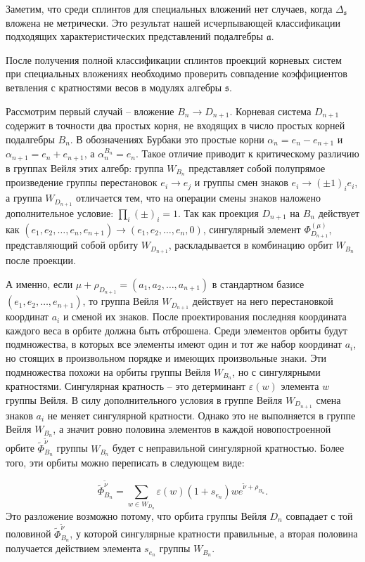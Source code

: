 \documentclass[12pt]{article}
\newcommand{\af}{\mathfrak{a}}
\newcommand{\sfr}{\mathfrak{s}}
\begin{document}
Заметим, что среди сплинтов для специальных вложений нет случаев, когда $\Delta_{\sfr}$ вложена не
метрически. Это результат нашей исчерпывающей классификации подходящих характеристических
представлений подалгебры $\af$.

После получения полной классификации сплинтов проекций корневых систем при специальных вложениях
необходимо проверить совпадение коэффициентов ветвления с кратностями весов в модулях алгебры $\sfr$.

Рассмотрим первый случай -- вложение $B_{n}\to D_{n+1}$. Корневая система $D_{n+1}$ содержит в
точности два простых корня, не входящих в число простых корней подалгебры $B_{n}$. В обозначениях Бурбаки
\cite{bourbaki2002lie} это простые корни $\alpha_{n}=e_n-e_{n+1}$ и $\alpha_{n+1}=e_n+e_{n+1}$, а
$\alpha_n^{B_n}=e_n$. Такое отличие приводит к критическому различию в группах Вейля этих алгебр:
группа $W_{B_{n}}$ представляет собой полупрямое произведение группы перестановок $e_{i} \to e_{j}$
и группы смен знаков $e_{i}\to (\pm 1)_{i}e_{i}$, а группа $W_{D_{n+1}}$ отличается тем, что на
операции смены знаков наложено дополнительное условие: $\prod_{i} (\pm)_{i}=1.$ Так как проекция
$D_{n+1}$ на $B_{n}$ действует как
$(e_1,e_2,\dots,e_{n},e_{n+1})\to(e_1,e_2,\dots,e_{n},0)$, сингулярный элемент
$\Phi^{(\mu)}_{D_{n+1}}$, представляющий собой орбиту $W_{D_{n+1}}$, раскладывается в комбинацию
орбит  $W_{B_{n}}$ после проекции.

А именно, если $\mu+\rho_{D_{n+1}}=(a_1,a_2,\dots,a_{n+1})$ в стандартном базисе
$(e_1,e_2,\dots,e_{n+1})$, то группа Вейля $W_{D_{n+1}}$ действует на него перестановкой координат
$a_i$ и сменой их знаков. После проектирования последняя координата каждого веса в орбите должна быть
отброшена. Среди элементов орбиты будут подмножества, в которых все элементы имеют один и тот же
набор координат $a_i$, но стоящих в произвольном порядке и имеющих произвольные знаки. Эти
подмножества похожи на орбиты группы Вейля $W_{B_{n}}$, но с сингулярными кратностями. Сингулярная
кратность -- это детерминант
$\varepsilon (w)$ элемента  $w$ группы Вейля. В силу дополнительного условия в группе Вейля
$W_{D_{n+1}}$ смена знаков  $a_i$ не меняет сингулярной кратности. Однако это не выполняется в
группе Вейля $W_{B_{n}}$, а значит ровно половина элементов в каждой новопостроенной орбите
$\tilde\Phi^{\tilde\nu}_{B_n}$ группы $W_{B_{n}}$ будет с неправильной сингулярной кратностью. Более
того, эти орбиты можно переписать в следующем виде:

\begin{equation}
\tilde\Phi^{\tilde\nu}_{B_n}=\sum_{w\in W_{D_n}} \varepsilon(w) (1+s_{e_n})w e^{\tilde\nu+\rho_{B_n}}.
\end{equation}
Это разложение возможно потому, что орбита группы Вейля $D_n$ совпадает с той половиной
$\tilde\Phi^{\tilde\nu}_{B_n}$, у которой сингулярные кратности правильные, а вторая половина
получается действием элемента $s_{e_n}$ группы $W_{B_{n}}$.
\end{document}
